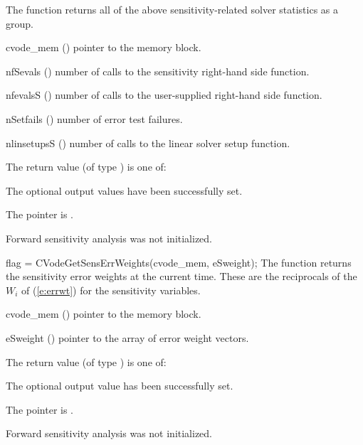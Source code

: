{
  The function  returns all of the above sensitivity-related solver
  statistics as a group.
}
{
  \begin{args}
  \item[cvode\_mem] ()
    pointer to the {\cvodes} memory block.
  \item[nfSevals] ()
    number of calls to the sensitivity right-hand side function.
  \item[nfevalsS] ()
    number of calls to the user-supplied right-hand side function.
  \item[nSetfails] ()
    number of error test failures.
  \item[nlinsetupsS] ()
    number of calls to the linear solver setup function.
  \end{args}
}
{
  The return value  (of type ) is one of:
  \begin{args}
  \item[\Id{CV\_SUCCESS}] 
    The optional output values have been successfully set.
  \item[\Id{CV\_MEM\_NULL}]
    The  pointer is .
  \item[\Id{CV\_NO\_SENS}]
    Forward sensitivity analysis was not initialized.
  \end{args}
}
{}
{
  flag = CVodeGetSensErrWeights(cvode\_mem, eSweight);
}
{
  The function  returns the sensitivity error weights at the
  current time. These are the reciprocals of the $W_i$ of (\ref{e:errwt}) for the
  sensitivity variables.
}
{
  \begin{args}
  \item[cvode\_mem] ()
    pointer to the {\cvodes} memory block.
  \item[eSweight] ()
    pointer to the array of error weight vectors.
  \end{args}
}
{
  The return value  (of type ) is one of:
  \begin{args}
  \item[\Id{CV\_SUCCESS}] 
    The optional output value has been successfully set.
  \item[\Id{CV\_MEM\_NULL}]
    The  pointer is .
  \item[\Id{CV\_NO\_SENS}]
    Forward sensitivity analysis was not initialized.
  \end{args}
}
